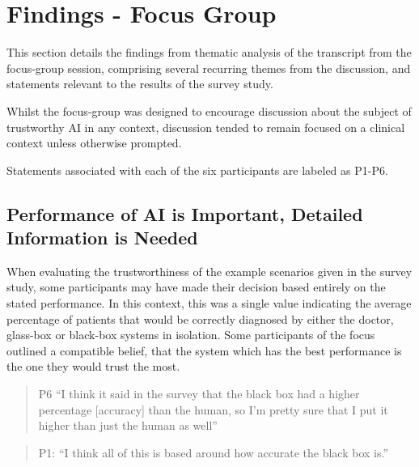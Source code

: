 \documentclass[manuscript,screen,review]{acmart}
\begin{document}
\newpage
\section{Findings - Focus Group}

This section details the findings from thematic analysis of the transcript from the focus-group session, comprising several recurring themes from the discussion, and statements relevant to the results of the survey study. 


Whilst the focus-group was designed to encourage discussion about the subject of trustworthy AI in any context, discussion tended to remain focused on a clinical context unless otherwise prompted.

Statements associated with each of the six participants are labeled as P1-P6. 


\subsection{Performance of AI is Important, Detailed Information is Needed}
When evaluating the trustworthiness of the example scenarios given in the survey study, some participants may have made their decision based entirely on the stated performance. In this context, this was a single value indicating the average percentage of patients that would be correctly diagnosed by either the doctor, glass-box or black-box systems in isolation. Some participants of the focus outlined a compatible belief, that the system which has the best performance is the one they would trust the most. 

\begin{quote}
P6 “I think it said in the survey that the black box had a higher percentage [accuracy] than the human, so I'm pretty sure that I put it higher than just the human as well”
\end{quote}

\begin{quote}
P1: “I think all of this is based around how accurate the black box is.” 
\end{quote}
\end{document}

